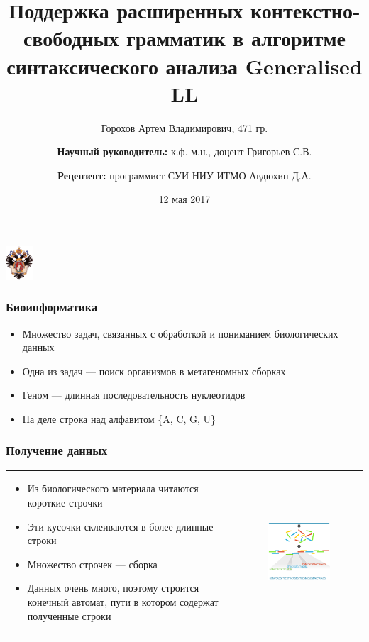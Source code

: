 \documentclass{beamer}
\title[]{Поддержка расширенных контекстно-свободных грамматик в алгоритме синтаксического анализа Generalised LL}
\institute[СПбГУ]{ Санкт-Петербургский Государственный Университет }
\author[Горохов Артем]{Горохов Артем Владимирович, 471 гр. \\
    \and  
    {\bfseries Научный руководитель:} к.ф.-м.н., доцент Григорьев С.В. \\ 
    \and  
    {\bfseries Рецензент:} \small{программист СУИ НИУ ИТМО } Авдюхин Д.А. \\ 
}
\date{12 мая 2017}
\begin{document}
 

\begin{frame}
	\begin{center} 
		{\includegraphics[width=1cm]{pictures/SPbGU_Logo.png}} 
	\end{center}
	\titlepage
\end{frame}



\begin{frame}
     \frametitle{Биоинформатика}
     \begin{itemize}
         \item Множество задач, связанных с обработкой и пониманием биологических данных
         \item Одна из задач --- поиск организмов в метагеномных сборках
         \item Геном --- длинная последовательность нуклеотидов
         \item На деле строка над алфавитом \{A, C, G, U\}
     \end{itemize}
 \end{frame}
 
 \begin{frame}
     \frametitle{Получение данных}
     \begin{tabular}{p{5cm} p{7cm}}
         \begin{itemize}
             \item Из биологического материала читаются короткие строчки
             \item Эти кусочки склеиваются в более длинные строки
             \item Множество строчек --- сборка
             \item Данных очень много, поэтому строится конечный автомат, пути в котором содержат полученные строки
         \end{itemize}
         &
         \begin{figure}[b]
             \centering
             \includegraphics[width=6.5cm]{pictures/readsAssembly.png}  
         \end{figure}
     \end{tabular}
 \end{frame}
 
\end{document}
